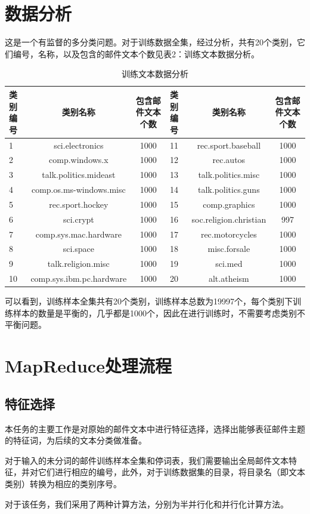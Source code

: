 \documentclass[lang=cn,11pt]{elegantpaper}
\begin{document}
\section{数据分析}
这是一个有监督的多分类问题。对于训练数据全集，经过分析，共有20个类别，它们编号，名称，以及包含的邮件文本个数见表2：训练文本数据分析。\par
\begin{table}[H]
  \small
  \centering
  \caption{训练文本数据分析 \label{tab:reg}}
    \begin{tabular}{lcc|lcc}
    \toprule
    类别编号  &   类别名称  &   包含邮件文本个数  &   类别编号  & 类别名称  & 包含邮件文本个数  \\
    \hline
    1 & sci.electronics & 1000            & 11 & rec.sport.baseball & 1000 \\
    2 & comp.windows.x & 1000             & 12 & rec.autos & 1000 \\
    3 & talk.politics.mideast & 1000      & 13 & talk.politics.misc & 1000 \\
    4 & comp.os.ms-windows.misc & 1000    & 14 & talk.politics.guns & 1000 \\
    5 & rec.sport.hockey & 1000           & 15 & comp.graphics & 1000 \\
    6 & sci.crypt & 1000                  & 16 & soc.religion.christian & 997 \\
    7 & comp.sys.mac.hardware & 1000      & 17 & rec.motorcycles & 1000 \\
    8 & sci.space & 1000                  & 18 & misc.forsale & 1000 \\
    9 & talk.religion.misc & 1000         & 19 & sci.med & 1000 \\
    10 & comp.sys.ibm.pc.hardware & 1000  & 20 & alt.atheism & 1000 \\
    \bottomrule
    \end{tabular}%
\end{table}%
可以看到，训练样本全集共有20个类别，训练样本总数为19997个，每个类别下训练样本的数量是平衡的，几乎都是1000个，因此在进行训练时，不需要考虑类别不平衡问题。


\section{MapReduce处理流程}
\subsection{特征选择}
本任务的主要工作是对原始的邮件文本中进行特征选择，选择出能够表征邮件主题的特征词，为后续的文本分类做准备。\par
对于输入的未分词的邮件训练样本全集和停词表，我们需要输出全局邮件文本特征，并对它们进行相应的编号，此外，对于训练数据集的目录，将目录名（即文本类别）转换为相应的类别序号。\par
对于该任务，我们采用了两种计算方法，分别为半并行化和并行化计算方法。
\end{document}
